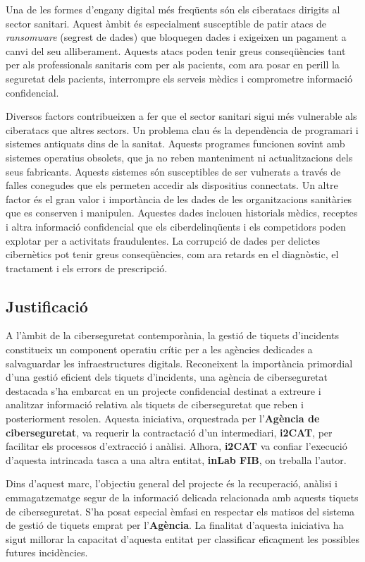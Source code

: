 Una de les formes d'engany digital més freqüents són els ciberatacs dirigits al sector sanitari. Aquest àmbit és especialment susceptible de patir atacs de \textit{ransomware} (segrest de dades) que bloquegen dades i exigeixen un pagament a canvi del seu alliberament. Aquests atacs poden tenir greus conseqüències tant per als professionals sanitaris com per als pacients, com ara posar en perill la seguretat dels pacients, interrompre els serveis mèdics i comprometre informació confidencial.

Diversos factors contribueixen a fer que el sector sanitari sigui més vulnerable als ciberatacs que altres sectors. Un problema clau és la dependència de programari i sistemes antiquats dins de la sanitat. Aquests programes funcionen sovint amb sistemes operatius obsolets, que ja no reben manteniment ni actualitzacions dels seus fabricants. Aquests sistemes són susceptibles de ser vulnerats a través de falles conegudes que els permeten accedir als dispositius connectats. Un altre factor és el gran valor i importància de les dades de les organitzacions sanitàries que es conserven i manipulen. Aquestes dades inclouen historials mèdics, receptes i altra informació confidencial que els ciberdelinqüents i els competidors poden explotar per a activitats fraudulentes. La corrupció de dades per delictes cibernètics pot tenir greus conseqüències, com ara retards en el diagnòstic, el tractament i els errors de prescripció.

\subsection{Justificació}
A l'àmbit de la ciberseguretat contemporània, la gestió de tiquets d'incidents constitueix un component operatiu crític per a les agències dedicades a salvaguardar les infraestructures digitals. Reconeixent la importància primordial d'una gestió eficient dels tiquets d'incidents, una agència de ciberseguretat destacada s'ha embarcat en un projecte confidencial destinat a extreure i analitzar informació relativa als tiquets de ciberseguretat que reben i posteriorment resolen. Aquesta iniciativa, orquestrada per l'\textbf{Agència de ciberseguretat}, va requerir la contractació d'un intermediari, \textbf{i2CAT}, per facilitar els processos d'extracció i anàlisi. Alhora, \textbf{i2CAT} va confiar l'execució d'aquesta intrincada tasca a una altra entitat, \textbf{inLab FIB}, on treballa l'autor.

Dins d'aquest marc, l'objectiu general del projecte és la recuperació, anàlisi i emmagatzematge segur de la informació delicada relacionada amb aquests tiquets de ciberseguretat. S'ha posat especial èmfasi en respectar els matisos del sistema de gestió de tiquets emprat per l'\textbf{Agència}. La finalitat d'aquesta iniciativa ha sigut millorar la capacitat d'aquesta entitat per classificar eficaçment les possibles futures incidències.

